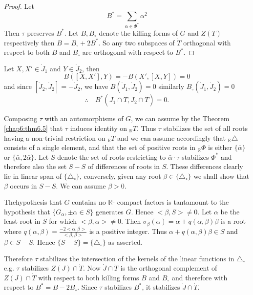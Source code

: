 \begin{proof}
  Let 
  $$
  B^* = \sum_{\alpha \in \Phi^*} \alpha^2
  $$
  Then $\tau$ preserves $B^*$. Let $B, B_\circ$ denote the killing
  forms of $G$ and $Z(T)$ respectively then $B= B_\circ+ 2 B^*$. So
  any two subspaces of $\dot{T}$ orthogonal with respect to both $B$
  and $B_\circ$ are orthogonal with respect to $B^*$.
\end{proof}

Let $X, X' \in \dot{J}_1$ and $Y \in \dot{J}_2$, then 
$$
B([X, X'], Y)= - B(X', [X, Y])=0
$$
and since $[\dot{J}_2, \dot{J}_2]= - \dot{J}_2$, we have $B(\dot{J}_1,
\dot{J}_2)=0$ similarly $B_\circ (\dot{J}_1, \dot{J}_2)=0$
$$
\therefore \quad B^* (\dot{J}_1 \cap \dot{T}, \dot{J
}_2  \cap \dot{T})=0.
$$

Composing $\tau$ with an automorphisms of $\dot{G}$, we can assume by
the Theorem \ref{chap6:thm6.5} that $\tau$ induces identity on
${}_\mathbb{R} T$. Thus $\tau$ stabilizes the set of all roots having
a non-trivial restriction on ${}_\mathbb{R} T$ and we can assume
accordingly that ${}_\mathbb{R} \triangle$ consists of a single
element, and that the set of positive roots in ${}_\mathbb{R} \Phi$ is
either $\{\bar{\alpha} \}$ or $\{ \bar{\alpha}, 2 \bar{\alpha}\}$. Let
$S$ denote the set of roots restricting to $\bar{\alpha} \cdot\tau$
stabilizes $\Phi^*$ and therefore also the set $S-S$ of differences of
roots in $S$. These differences clearly lie in linear span of $\{
\triangle_\circ\}$, conversely, given any root $\beta \in \{
\triangle_\circ\}$ we shall show that $\beta$ occurs in $S-S$. We can
assume $\beta > 0$. 

The\pageoriginale hypothesis that $G$ contains no $\mathbb{R}$- compact factors is
tantamount to the hypothesis that $\{G_\alpha, \pm \alpha \in S \}$
generates $G$. Hence $<\beta, S>\neq 0$. Let $\alpha$ be the least
root in $S$ for which $<\beta, \alpha>\neq 0$. Then $\sigma_\beta
(\alpha)= \alpha + q (\alpha, \beta) \beta$ is a root where $q(\alpha,
\beta)= \frac{-2 <\alpha, \beta>}{<\beta, \beta>}$ is a positive
integer. Thus $\alpha + q (\alpha, \beta) \beta \in S$ and $\beta \in
S-S$. Hence $\{S-S\}= \{ \triangle_\circ\}$ as asserted.

Therefore $\tau$ stabilizes the intersection of the kernels of the
linear functions in $\triangle_\circ$ e.g. $\tau$ stabilizes $Z(J)
\cap \dot{T}$. Now $\dot{J} \cap \dot{T}$ is the orthogonal complement
of $Z(J) \cap \dot{T}$ with respect to both killing forms $B$ and
$B_\circ$ and therefore with respect to $B^*=B-2B_\circ$. Since $\tau$
stabilizes $B^*$, it stabilizes $\dot{J} \cap \dot{T}$.

